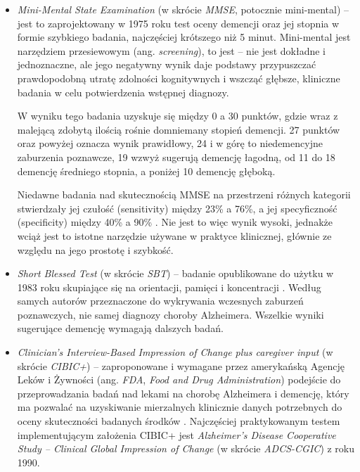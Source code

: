 \begin{itemize}

  \item \emph{Mini-Mental State Examination} (w skrócie \emph{MMSE}, potocznie mini-mental) -- jest to zaprojektowany w 1975 roku test oceny demencji oraz jej stopnia w formie szybkiego badania, najczęściej krótszego niż 5 minut.
        Mini-mental jest narzędziem przesiewowym (ang. \emph{screening}), to jest -- nie jest dokładne i jednoznaczne, ale jego negatywny wynik daje podstawy przypuszczać prawdopodobną utratę zdolności kognitywnych i wszcząć
        głębsze, kliniczne badania w celu potwierdzenia wstępnej diagnozy.

        W wyniku tego badania uzyskuje się między 0 a 30 punktów, gdzie wraz z malejącą zdobytą ilością rośnie domniemany stopień demencji.
        27 punktów oraz powyżej oznacza wynik prawidłowy, 24 i w górę to niedemencyjne zaburzenia poznawcze, 19 wzwyż sugerują demencję łagodną, od 11 do 18 demencję średniego stopnia, a poniżej 10 demencję głęboką.

        Niedawne badania nad skutecznością MMSE na przestrzeni różnych kategorii stwierdzały jej czułość (sensitivity) między 23\% a 76\%, a jej specyficzność (specificity) między 40\% a 90\% \cite{arevalo2015mini}.
        Nie jest to więc wynik wysoki, jednakże wciąż jest to istotne narzędzie używane w praktyce klinicznej, głównie ze względu na jego prostotę i szybkość.

  \item \emph{Short Blessed Test} (w skrócie \emph{SBT}) -- badanie opublikowane do użytku w 1983 roku skupiające się na orientacji, pamięci i koncentracji \cite{katzman1983validation}.
        Według samych autorów przeznaczone do wykrywania wczesnych zaburzeń poznawczych, nie samej diagnozy choroby Alzheimera.
        Wszelkie wyniki sugerujące demencję wymagają dalszych badań.

  \item \emph{Clinician's Interview-Based Impression of Change plus caregiver input} (w skrócie \emph{CIBIC+}) -- zaproponowane i wymagane przez amerykańską Agencję Leków i Żywności (ang. \emph{FDA}, \emph{Food and Drug Administration}) podejście do przeprowadzania badań nad lekami na chorobę Alzheimera i demencję, który ma pozwalać na uzyskiwanie mierzalnych klinicznie danych potrzebnych do oceny skuteczności badanych środków \cite{joffres2000qualitative}.
        Najczęściej praktykowanym testem implementującym założenia CIBIC+ jest \emph{Alzheimer's Disease Cooperative Study -- Clinical Global Impression of Change} (w skrócie \emph{ADCS-CGIC}) z roku 1990.


\end{itemize}
